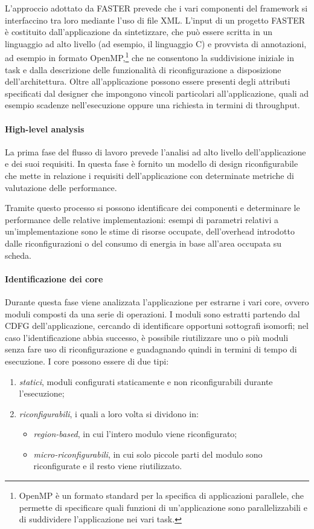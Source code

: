 L'approccio adottato da \ac{FASTER} prevede che i vari componenti del framework 
si interfaccino tra loro mediante l'uso di file XML. L'input di un progetto 
\ac{FASTER} è costituito dall'applicazione da sintetizzare, che può 
essere scritta in un linguaggio ad alto livello (ad esempio, il linguaggio C) e 
provvista di annotazioni, ad esempio in formato OpenMP,\footnote{OpenMP è un 
formato standard per la specifica di applicazioni parallele, che permette di 
specificare quali funzioni di un'applicazione sono parallelizzabili e di 
suddividere l'applicazione nei vari task.} che ne consentono la suddivisione 
iniziale in task e dalla descrizione delle funzionalità di riconfigurazione a 
disposizione dell'architettura. Oltre all'applicazione possono essere presenti 
degli attributi specificati dal designer che impongono vincoli particolari 
all'applicazione, quali ad esempio scadenze nell'esecuzione oppure una 
richiesta in termini di throughput.

\paragraph{High-level analysis}
La prima fase del flusso di lavoro prevede l'analisi ad alto livello 
dell'applicazione e dei suoi requisiti. In questa fase è fornito un modello di 
design riconfigurabile che mette in relazione i requisiti dell'applicazione con 
determinate metriche di valutazione delle performance.

Tramite questo processo si possono identificare dei componenti e determinare le 
performance delle relative implementazioni: esempi di parametri relativi a
un'implementazione sono le stime di risorse occupate, dell'overhead introdotto 
dalle riconfigurazioni o del consumo di energia in base all'area occupata su 
scheda.

\paragraph{Identificazione dei core}
Durante questa fase viene analizzata l'applicazione per estrarne i vari core, 
ovvero moduli composti da una serie di operazioni. I moduli sono estratti 
partendo dal \ac{CDFG} dell'applicazione, cercando di identificare opportuni 
sottografi isomorfi; nel caso l'identificazione abbia successo, è possibile 
riutilizzare uno o più moduli senza fare uso di riconfigurazione e guadagnando 
quindi in termini di tempo di esecuzione.
I core possono essere di due tipi:
\begin{enumerate}
 \item \emph{statici}, moduli configurati staticamente e non riconfigurabili 
durante l'esecuzione;
 \item \emph{riconfigurabili}, i quali a loro volta si dividono in:
  \begin{itemize}
   \item \emph{region-based}, in cui l'intero modulo viene riconfigurato;
   \item \emph{micro-riconfigurabili}, in cui solo piccole parti del modulo 
sono riconfigurate e il resto viene riutilizzato.
  \end{itemize}
\end{enumerate}

